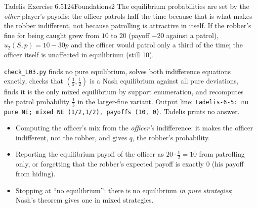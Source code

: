 \begin{exsol}{Tadelis Exercise 6.5}{124}{Foundations}{2}
\interp The equilibrium probabilities are set by the \emph{other} player's payoffs: the officer
patrols half the time because that is what makes the robber indifferent, not because patrolling is
attractive in itself. If the robber's fine for being caught grew from $10$ to $20$ (payoff $-20$ against a
patrol), $u_2(S,p) = 10 - 30p$ and the officer would patrol only a third of the time; the officer
itself is unaffected in equilibrium (still 10).

\verify \texttt{check\_L03.py} finds no pure equilibrium, solves both indifference equations
exactly, checks that $(\frac12,\frac12)$ is a Nash equilibrium against all pure deviations, finds it is
the only mixed equilibrium by support enumeration, and recomputes the patrol probability
$\frac13$ in the larger-fine variant. Output line: \texttt{tadelis-6-5: no pure NE; mixed NE
(1/2,1/2), payoffs (10, 0)}. Tadelis prints no answer.

\mistakes
\begin{itemize}
  \item Computing the officer's mix from the \emph{officer's} indifference: it makes the officer
  indifferent, not the robber, and gives $q$, the robber's probability.
  \item Reporting the equilibrium payoff of the officer as $20 \cdot \frac12 = 10$ from patrolling only,
  or forgetting that the robber's expected payoff is exactly $0$ (his payoff from hiding).
  \item Stopping at ``no equilibrium'': there is no equilibrium \emph{in pure strategies}; Nash's theorem
  gives one in mixed strategies.
\end{itemize}

\end{exsol}
